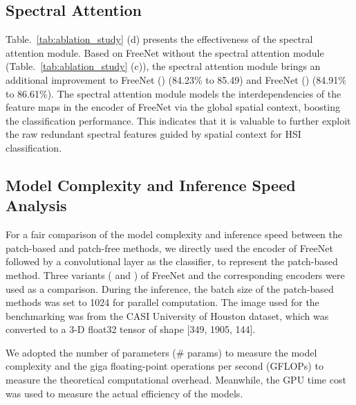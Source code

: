 \documentclass[journal]{IEEEtran}
\begin{document}
\subsection{\textbf{Spectral Attention}}
Table.~\ref{tab:ablation_study} (d) presents the effectiveness of the spectral attention module.
Based on FreeNet without the spectral attention module (Table.~\ref{tab:ablation_study} (c)), the spectral attention module brings an additional improvement to FreeNet () (84.23\% to 85.49) and FreeNet () (84.91\% to 86.61\%).
The spectral attention module models the interdependencies of the feature maps in the encoder of FreeNet via the global spatial context, boosting the classification performance.
This indicates that it is valuable to further exploit the raw redundant spectral features guided by spatial context for HSI classification.

\subsection{\textbf{Model Complexity and Inference Speed Analysis}}
For a fair comparison of the model complexity and inference speed between the patch-based and patch-free methods, we directly used the encoder of FreeNet followed by a  convolutional layer as the classifier, to represent the patch-based method.
Three variants ( and ) of FreeNet and the corresponding encoders were used as a comparison.
During the inference, the batch size of the patch-based methods was set to 1024 for parallel computation.
The image used for the benchmarking was from the CASI University of Houston dataset, which was converted to a 3-D float32 tensor of shape [349, 1905, 144].

We adopted the number of parameters (\# params) to measure the model complexity and the giga floating-point operations per second (GFLOPs) to measure the theoretical computational overhead.
Meanwhile, the GPU time cost was used to measure the actual efficiency of the models.
\end{document}

